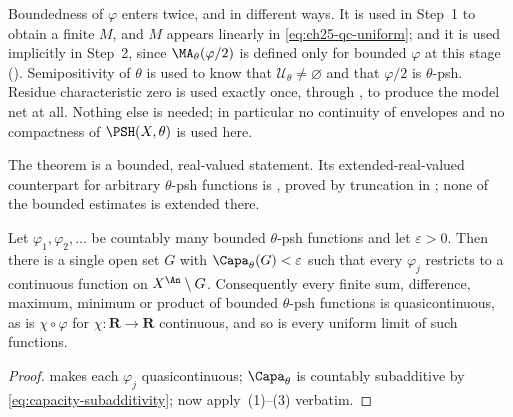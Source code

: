 \begin{remark}
\label{rem:ch25-qc-hypotheses}
Boundedness of $\varphi$ enters twice, and in different ways.  It is used
in Step~1 to obtain a finite $M$, and $M$ appears linearly in
\eqref{eq:ch25-qc-uniform}; and it is used implicitly in Step~2, since
$\MA_\theta(\varphi/2)$ is defined only for bounded $\varphi$ at this
stage ().  Semipositivity of $\theta$ is
used to know that $\mathcal U_\theta\neq\varnothing$ and that
$\varphi/2$ is $\theta$-psh.  Residue characteristic zero is used exactly
once, through , to produce the model
net at all.  Nothing else is needed; in particular no continuity of
envelopes and no compactness of $\PSH(X,\theta)$ is used here.

The theorem is a bounded, real-valued statement.  Its extended-real-valued
counterpart for arbitrary $\theta$-psh functions is
, proved by truncation in
; none of the bounded estimates is extended there.
\end{remark}

\begin{corollary}
\label{cor:ch25-quasicontinuity-calculus}
Let $\varphi_1,\varphi_2,\ldots$ be countably many bounded $\theta$-psh
functions and let $\varepsilon>0$.  Then there is a single open set $G$
with $\Capa_\theta(G)<\varepsilon$ such that every $\varphi_j$ restricts
to a continuous function on $X^{\An}\setminus G$.  Consequently every
finite sum, difference, maximum, minimum or product of bounded
$\theta$-psh functions is quasicontinuous, as is $\chi\circ\varphi$ for
$\chi:\mathbf R\to\mathbf R$ continuous, and so is every uniform limit of
such functions.
\end{corollary}

\begin{proof}
 makes each $\varphi_j$ quasicontinuous;
$\Capa_\theta$ is countably subadditive by
\eqref{eq:capacity-subadditivity}; now apply
\,(1)--(3) verbatim.
\end{proof}

